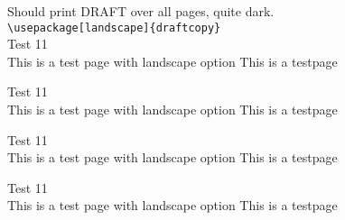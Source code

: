 \documentclass[landscape,a4paper]{article}
\newcommand{\xx}{
Test 11\\This is a test page with landscape option \thepage \vfill
This is a testpage \thepage \newpage
}
\begin{document}
Should print DRAFT over all pages, quite dark.\\
\verb|\usepackage[landscape]{draftcopy}|\\
\xx\xx\xx\xx
\end{document}
